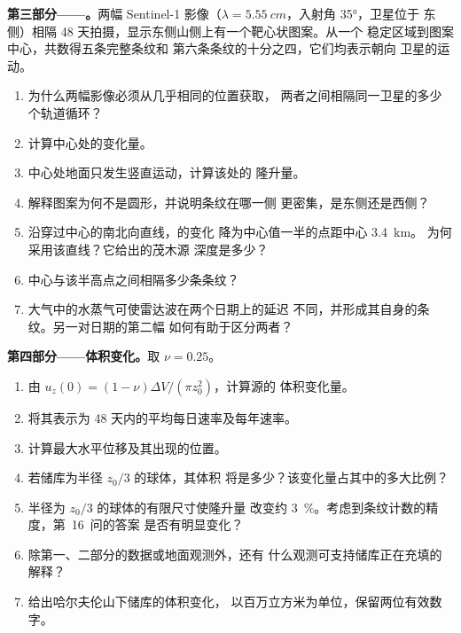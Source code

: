 \begin{problem}
\medskip\noindent\textbf{第三部分——。}两幅 Sentinel-1
影像（$\lambda = \qty{5.55}{cm}$，入射角 \ang{35}，卫星位于
东侧）相隔 48 天拍摄，显示东侧山侧上有一个靶心状图案。从一个
稳定区域到图案中心，共数得五条完整条纹和
第六条条纹的十分之四，它们均表示朝向
卫星的运动。
\begin{enumerate}[resume]
\item 为什么两幅影像必须从几乎相同的位置获取，
  两者之间相隔同一卫星的多少个轨道循环？
\item 计算中心处的变化量。
\item 中心处地面只发生竖直运动，计算该处的
  隆升量。
\item 解释图案为何不是圆形，并说明条纹在哪一侧
  更密集，是东侧还是西侧？
\item 沿穿过中心的南北向直线，的变化
  降为中心值一半的点距中心 \qty{3.4}{km}。
  为何采用该直线？它给出的茂木源
  深度是多少？
\item 中心与该半高点之间相隔多少条条纹？
\item 大气中的水蒸气可使雷达波在两个日期上的延迟
  不同，并形成其自身的条纹。另一对日期的第二幅
  如何有助于区分两者？
\end{enumerate}

\medskip\noindent\textbf{第四部分——体积变化。}取 $\nu = 0.25$。
\begin{enumerate}[resume]
\item 由 $u_z(0) = (1 - \nu)\Delta V/(\pi z_0^2)$，计算源的
  体积变化量。
\item 将其表示为 48 天内的平均每日速率及每年速率。
\item 计算最大水平位移及其出现的位置。
\item 若储库为半径 $z_0/3$ 的球体，其体积
  将是多少？该变化量占其中的多大比例？
\item 半径为 $z_0/3$ 的球体的有限尺寸使隆升量
  改变约 \qty{3}{\percent}。考虑到条纹计数的精度，第~16~问的答案
  是否有明显变化？
\item 除第一、二部分的数据或地面观测外，还有
  什么观测可支持储库正在充填的解释？
\item 给出哈尔夫伦山下储库的体积变化，
  以百万立方米为单位，保留两位有效数字。
\end{enumerate}
\end{problem}
